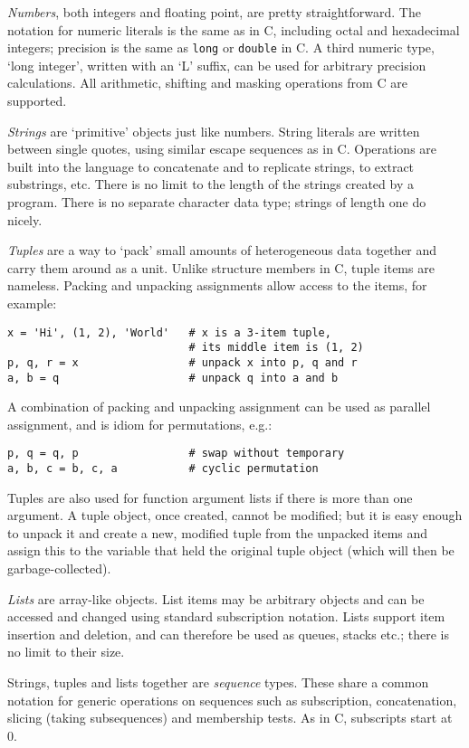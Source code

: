 {\em Numbers}, both integers and floating point, are pretty
straightforward.  The notation for numeric literals is the same as in
C, including octal and hexadecimal integers; precision is the same as
{\tt long} or {\tt double} in C\@.  A third numeric type, `long
integer', written with an `L' suffix, can be used for arbitrary
precision calculations.  All arithmetic, shifting and masking
operations from C are supported.

{\em Strings} are `primitive' objects just like numbers.  String
literals are written between single quotes, using similar escape
sequences as in C\@.  Operations are built into the language to
concatenate and to replicate strings, to extract substrings, etc.
There is no limit to the length of the strings created by a program.
There is no separate character data type; strings of length one do
nicely.

{\em Tuples} are a way to `pack' small amounts of heterogeneous data
together and carry them around as a unit.  Unlike structure members in
C, tuple items are nameless.  Packing and unpacking assignments allow
access to the items, for example:
\begin{verbatim}
x = 'Hi', (1, 2), 'World'   # x is a 3-item tuple,
                            # its middle item is (1, 2)
p, q, r = x                 # unpack x into p, q and r
a, b = q                    # unpack q into a and b
\end{verbatim}
A combination of packing and unpacking assignment can be used as
parallel assignment, and is idiom for permutations, e.g.:
\begin{verbatim}
p, q = q, p                 # swap without temporary
a, b, c = b, c, a           # cyclic permutation
\end{verbatim}
Tuples are also used for function argument lists if there is more than
one argument.  A tuple object, once created, cannot be modified; but
it is easy enough to unpack it and create a new, modified tuple from
the unpacked items and assign this to the variable that held the
original tuple object (which will then be garbage-collected).

{\em Lists} are array-like objects.  List items may be arbitrary
objects and can be accessed and changed using standard subscription
notation.  Lists support item insertion and deletion, and can
therefore be used as queues, stacks etc.; there is no limit to their
size.

Strings, tuples and lists together are {\em sequence} types.  These
share a common notation for generic operations on sequences such as
subscription, concatenation, slicing (taking subsequences) and
membership tests.  As in C, subscripts start at 0.

